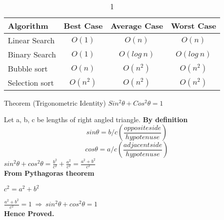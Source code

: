 \documentclass{beamer}
\begin{document}
\begin{frame}%
\transblindshorizontal%
 \begin{table}%

\begin{tabular}{|l|c|c|c|} %
\hline 
Algorithm              & Best Case      & Average Case            & Worst Case    \\
\hline
\hline 
Linear Search          &  $O(1)$        & $O(n)$                  &   $O(n)$      \\ 

Binary Search          &  $O(1)$        & $O(log\ n)$             &  $O(log\ n)$  \\ 

Bubble sort            & $O(n)$         &  $O(n^2)$               &$O(n^2)$       \\ 

Selection sort         & $O(n^2)$       &  $O(n^2)$               &$O(n^2)$       \\
 \hline   
\end{tabular}
\caption{1}
\end{table}

\begin{block}{Theorem (Trigonometric Identity)}%
$Sin^2\theta + Cos^2\theta = 1$
\end{block}
\end{frame}


\begin{frame}%
\transblindshorizontal %
\begin{theorem}
    Let a, b, c be lengths of right angled triangle.\newline
    \textbf{By definition}%
    \[sin\theta=b/c\left(\frac{oppositeside}{hypotenuse}\right)\]
\[cos\theta=a/c\left(\frac{adjacentside}{hypotenuse}\right)\]
\(sin^2\theta+cos^2\theta=\frac{b^2}{c^2}+\frac{a^2}{c^2}=\frac{a^2+b^2}{c^2}\)\\
    \bigskip%
    \textbf{From Pythagoras theorem}\newline
 
    $c^2 = a^2 + b^2$ \newline
    
    \(\frac{a^2+b^2}{c^2} = 1\ \Longrightarrow \  sin^2\theta+cos^2\theta = 1\)\\
    \bigskip %
    \textbf{Hence Proved.}%
    \end{theorem}
\end{frame}
\end{document}
